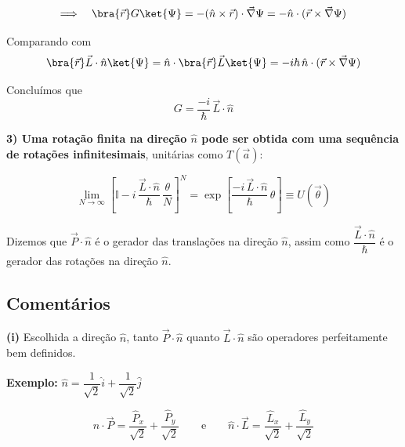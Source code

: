 \begin{equation}
    \Longrightarrow \quad \bra{\vec{r}} G \ket{\Psi} = -(\hat{n}\times\vec{r})\cdot\vec{\nabla}\Psi = -\hat{n}\cdot(\vec{r}\times\vec{\nabla}\Psi)
\label{eq:aula21_G_rotacao}
\end{equation}

Comparando com
\begin{equation}
    \bra{\vec{r}} \vec{L}\cdot\hat{n} \ket{\Psi} = \hat{n}\cdot\bra{\vec{r}}\vec{L}\ket{\Psi} = -i\hbar\,\hat{n}\cdot(\vec{r}\times\vec{\nabla}\Psi)
\label{eq:aula21_L_acao}
\end{equation}

Concluímos que
\begin{equation}
    \boxed{G = \frac{-i}{\hbar}\,\vec{L}\cdot\hat{n}}
\label{eq:aula21_G_rotacao_resultado}
\end{equation}

\textbf{3) Uma rotação finita na direção $\hat{n}$ pode ser obtida com uma sequência de rotações infinitesimais}, unitárias como $T(\vec{a})$:

\begin{equation}
    \lim_{N\to\infty}\left[\mathbb{I} - i\,\frac{\vec{L}\cdot\hat{n}}{\hbar}\,\frac{\theta}{N}\right]^N = \exp\left[\frac{-i\,\vec{L}\cdot\hat{n}}{\hbar}\,\theta\right] \equiv U(\vec{\theta})
\label{eq:aula21_U_finita}
\end{equation}

Dizemos que $\vec{P}\cdot\hat{n}$ é o gerador das translações na direção $\hat{n}$, assim como $\dfrac{\vec{L}\cdot\hat{n}}{\hbar}$ é o gerador das rotações na direção $\hat{n}$.

\subsection*{Comentários}

\textbf{(i)} Escolhida a direção $\hat{n}$, tanto $\vec{P}\cdot\hat{n}$ quanto $\vec{L}\cdot\hat{n}$ são operadores perfeitamente bem definidos.

\textbf{Exemplo:} $\hat{n} = \dfrac{1}{\sqrt{2}}\hat{i} + \dfrac{1}{\sqrt{2}}\hat{j}$

\begin{equation}
    \hat{n}\cdot\vec{P} = \frac{\hat{P}_x}{\sqrt{2}} + \frac{\hat{P}_y}{\sqrt{2}}
    \qquad \text{e} \qquad
    \hat{n}\cdot\vec{L} = \frac{\hat{L}_x}{\sqrt{2}} + \frac{\hat{L}_y}{\sqrt{2}}
\label{eq:aula21_exemplo_n}
\end{equation}

